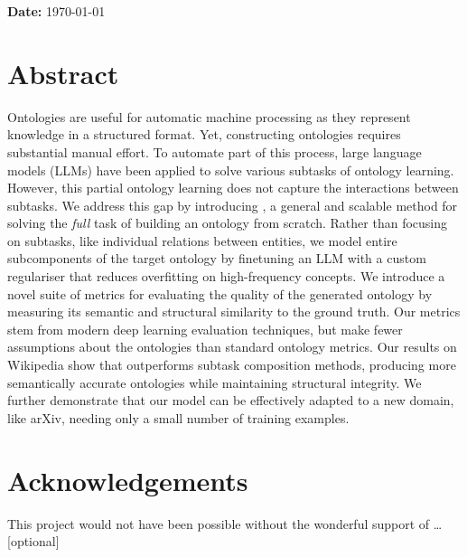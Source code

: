     \bigskip
    \textbf{Date:} \today
\fi
\vspace{\fill}
\makeatother

\chapter*{Abstract}

Ontologies are useful for automatic machine processing as they represent knowledge in a structured format. Yet, constructing ontologies requires substantial manual effort. To automate part of this process, large language models (LLMs) have been applied to solve various subtasks of ontology learning. However, this partial ontology learning does not capture the interactions between subtasks.
We address this gap by introducing \name, a general and scalable method for solving the \emph{full} task of building an ontology from scratch.
Rather than focusing on subtasks, like individual relations between entities, we model entire subcomponents of the target ontology by finetuning an LLM with a custom regulariser that reduces overfitting on high-frequency concepts. We introduce a novel suite of metrics for evaluating the quality of the generated ontology by measuring its semantic and structural similarity to the ground truth. Our metrics stem from modern deep learning evaluation techniques, but make fewer assumptions about the ontologies than standard ontology metrics.
Our results on Wikipedia show that \name outperforms subtask composition methods, producing more semantically accurate ontologies while maintaining structural integrity. We further demonstrate that our model can be effectively adapted to a new domain, like arXiv, needing only a small number of training examples.

\ifsubmission\else

    \chapter*{Acknowledgements}

    This project would not have been possible without the wonderful
    support of \ldots [optional]

\fi
\cleardoublepage %